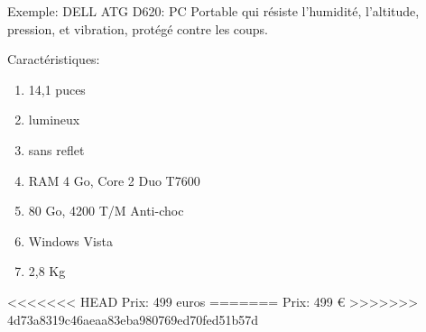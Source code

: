 \documentclass[a4paper]{article}
\begin{document}
Exemple:
DELL ATG D620: PC Portable qui résiste l'humidité, l'altitude, pression, et vibration, protégé 
contre les coups.
	
	Caractéristiques:

	\begin{enumerate}
		\item 14,1 puces
		\item lumineux
		\item sans reflet
		\item RAM 4 Go, Core 2 Duo T7600
		\item 80 Go, 4200 T/M Anti-choc
		\item Windows Vista
		\item 2,8 Kg
	\end{enumerate}

<<<<<<< HEAD
Prix: 499 euros
=======
Prix: 499 \euro
>>>>>>> 4d73a8319c46aeaa83eba980769ed70fed51b57d
\end{document}

